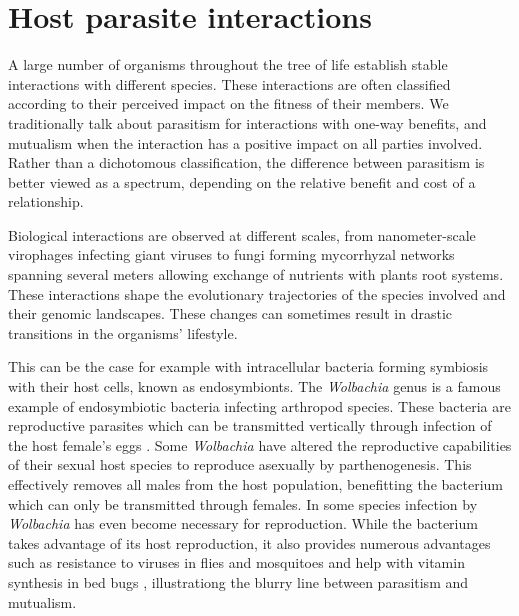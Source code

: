
\chapter{Host parasite interactions} %

\label{ch:01-01} %


A large number of organisms throughout the tree of life establish stable interactions with different species. These interactions are often classified according to their perceived impact on the fitness of their members. We traditionally talk about parasitism for interactions with one-way benefits, and mutualism when the interaction has a positive impact on all parties involved. Rather than a dichotomous classification, the difference between parasitism is better viewed as a spectrum, depending on the relative benefit and cost of a relationship.

Biological interactions are observed at different scales, from nanometer-scale virophages infecting giant viruses to fungi forming mycorrhyzal networks spanning several meters \citep{Johnson1997,Selosse2006} allowing exchange of nutrients with plants root systems. These interactions shape the evolutionary trajectories of the species involved and their genomic landscapes. These changes can sometimes result in drastic transitions in the organisms' lifestyle. 

This can be the case for example with intracellular bacteria forming symbiosis with their host cells, known as endosymbionts. The \textit{Wolbachia} genus is a famous example of endosymbiotic bacteria infecting arthropod species. These bacteria are reproductive parasites which can be transmitted vertically through infection of the host female's eggs \cite{Knight2001}. Some \textit{Wolbachia} have altered the reproductive capabilities of their sexual host species to reproduce asexually by \Gls{parthenogenesis}. This effectively removes all males from the host population, benefitting the bacterium which can only be transmitted through females. In some species infection by \textit{Wolbachia} has even become necessary for reproduction. While the bacterium takes advantage of its host reproduction, it also provides numerous advantages such as resistance to viruses in flies and mosquitoes \citep{Hedges2008,Teixeira2008} and help with vitamin synthesis in bed bugs \cite{Nikoh2014}, illustrationg the blurry line between parasitism and mutualism.

